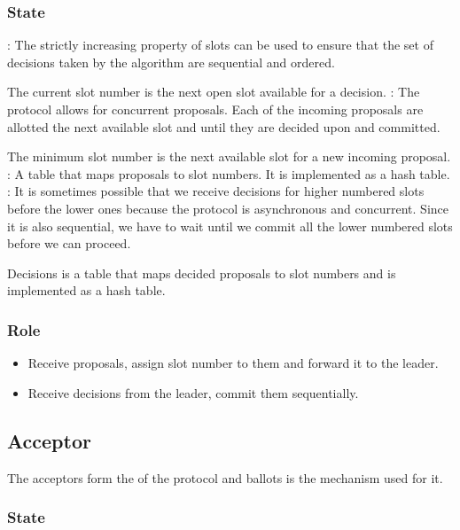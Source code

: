 \subsubsection{State}

\begin{itemize}
    : The strictly increasing property of slots
    can be used to ensure that the set of decisions taken by
    the algorithm are sequential and ordered.

    The current slot number is the next open slot available for a decision.
    : The protocol allows for concurrent proposals.
    Each of the incoming proposals are allotted the next available slot and
    until they are decided upon and committed.

    The minimum slot number is the next available slot for a new incoming
    proposal.
    : A table that maps proposals to slot numbers. It is
    implemented as a hash table.
    : It is sometimes possible that we receive decisions for
    higher numbered slots before the lower ones because the protocol is
    asynchronous and concurrent. Since it is also sequential, we have to wait
    until we commit all the lower numbered slots before we can proceed.

    Decisions is a table that maps decided proposals to slot numbers and is
    implemented as a hash table.
\end{itemize}

\subsubsection{Role}

\begin{itemize}
  \item Receive proposals, assign slot number to them and forward it to the
    leader.
  \item Receive decisions from the leader, commit them sequentially.
\end{itemize}

\subsection{Acceptor}

The acceptors form the  of the protocol and ballots is the
mechanism used for it.

\subsubsection{State}

